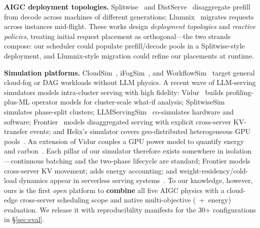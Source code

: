 \textbf{AIGC deployment topologies.}
Splitwise~\cite{patel2024splitwise} and
DistServe~\cite{zhong2024distserve} disaggregate prefill from
decode across machines of different generations;
Llumnix~\cite{sun2024llumnix} migrates requests across
instances mid-flight. These works design \emph{deployment
topologies} and \emph{reactive policies}, treating initial
request placement as orthogonal---the two strands compose:
our scheduler could populate prefill/decode pools in a
Splitwise-style deployment, and Llumnix-style migration could
refine our placements at runtime.

\textbf{Simulation platforms.}
CloudSim~\cite{calheiros2011cloudsim},
iFogSim~\cite{gupta2017ifogsim}, and
WorkflowSim~\cite{chen2012workflowsim} target general
cloud-fog or DAG workloads without LLM physics. A recent wave
of LLM-serving simulators models intra-cluster serving with
high fidelity: Vidur~\cite{agrawal2024vidur} builds
profiling-plus-ML operator models for cluster-scale what-if
analysis; SplitwiseSim~\cite{patel2024splitwise} simulates
phase-split clusters; LLMServingSim~\cite{cho2024llmservingsim}
co-simulates hardware and software;
Frontier~\cite{frontier2025sim} models disaggregated serving
with explicit cross-server KV-transfer events; and Helix's
simulator covers geo-distributed heterogeneous GPU
pools~\cite{mei2025helix}. An extension of Vidur couples a GPU
power model to quantify energy and
carbon~\cite{wiesner2025vidurvessim}. Each pillar of our
simulator therefore exists somewhere in isolation---continuous
batching and the two-phase lifecycle are standard; Frontier
models cross-server KV movement;
\cite{wiesner2025vidurvessim} adds energy accounting; and
weight-residency/cold-load dynamics appear in serverless
serving systems~\cite{fu2024serverlessllm}. To our knowledge,
however, ours is the first \emph{open} platform to
\textbf{combine} all five AIGC physics with a cloud-edge
cross-server scheduling scope and native multi-objective
(\slo{}~+~energy) evaluation. We release it with
reproducibility manifests for the 30+ configurations in
\S\ref{sec:eval}.
